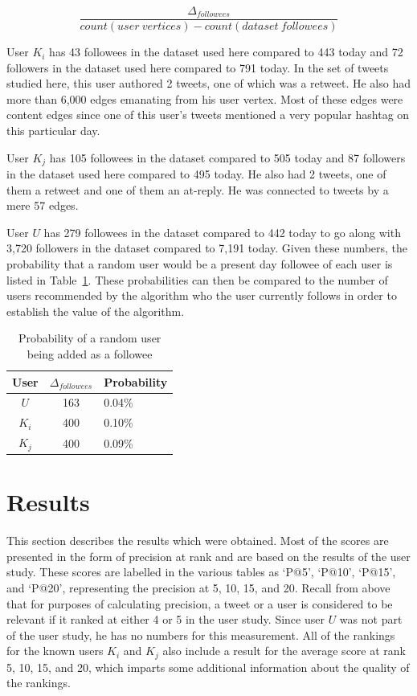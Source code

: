 \begin{center}
\[
\frac{\Delta_{followees} }{count(user\ vertices) - count(dataset\ followees)}
\]
\end{center}


User $K_{i}$ has 43 followees in the dataset used here compared to 443 today and 72 followers in the dataset used here compared to 791 today. In the set of tweets studied here, this user authored 2 tweets, one of which was a retweet. He also had more than 6,000 edges emanating from his user vertex. Most of these edges were content edges since one of this user's tweets mentioned a very popular hashtag on this particular day.

User $K_{j}$ has 105 followees in the dataset compared to 505 today and 87 followers in the dataset used here compared to 495 today. He also had 2 tweets, one of them a retweet and one of them an at-reply. He was connected to tweets by a mere 57 edges.

User $U$ has 279 followees in the dataset compared to 442 today to go along with 3,720 followers in the dataset compared to 7,191 today. Given these numbers, the probability that a random user would be a present day followee of each user is listed in Table~\ref{tab:RandomUserFolloweeProb}. These probabilities can then be compared to the number of users recommended by the algorithm who the user currently follows in order to establish the value of the algorithm.

\begin{table}
\centering
\begin{tabular}{c|c|l}
{\bf User} & {\bf $\Delta_{followees}$ } & {\bf Probability} \\ \hline
$U$ & 163 &  0.04\%   \\ \hline
$K_{i}$ & 400 & 0.10\% \\ \hline
$K_{j}$ & 400 & 0.09\% \\
\end{tabular}
\caption{Probability of a random user being added as a followee}
\label{tab:RandomUserFolloweeProb}
\end{table}


\section{Results}

This section describes the results which were obtained. Most of the scores are presented in the form of precision at rank and are based on the results of the user study. These scores are labelled in the various tables as `P@5', `P@10', `P@15', and `P@20', representing the precision at 5, 10, 15, and 20. Recall from above that for purposes of calculating precision, a tweet or a user is considered to be relevant if it ranked at either 4 or 5 in the user study. Since user $U$ was not part of the user study, he has no numbers for this measurement. All of the rankings for the known users $K_{i}$ and $K_{j}$ also include a result for the average score at rank 5, 10, 15, and 20, which imparts some additional information about the quality of the rankings.

